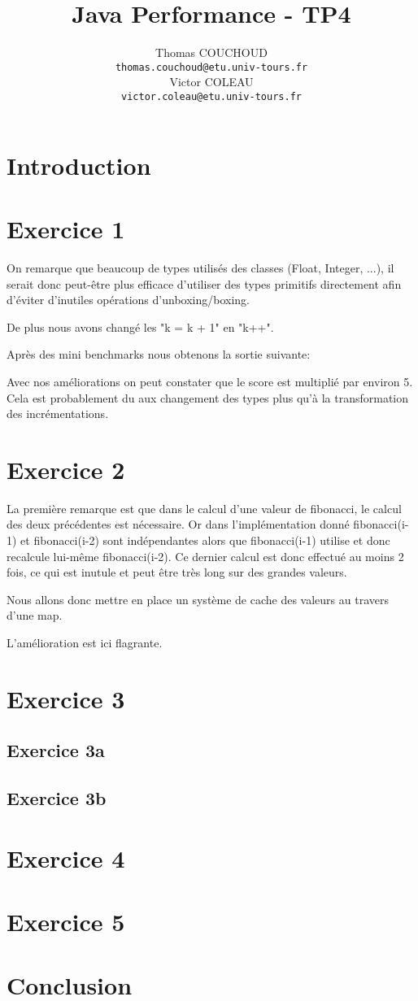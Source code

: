 \documentclass{report}
\title{Java Performance - TP4}
\author{Thomas COUCHOUD\\\texttt{thomas.couchoud@etu.univ-tours.fr}\\Victor COLEAU\\\texttt{victor.coleau@etu.univ-tours.fr}}
\begin{document}
	\mccTitle
	
	\chapter{Introduction}
	
	\chapter{Exercice 1}
		On remarque que beaucoup de types utilisés des classes (Float, Integer, ...), il serait donc peut-être plus efficace d'utiliser des types primitifs directement afin d'éviter d'inutiles opérations d'unboxing/boxing.
		
		De plus nous avons changé les "k = k + 1" en "k++".
		
		Après des mini benchmarks nous obtenons la sortie suivante:
		
		
		Avec nos améliorations on peut constater que le score est multiplié par environ 5.
		Cela est probablement du aux changement des types plus qu'à la transformation des incrémentations.

	\chapter{Exercice 2}
		La première remarque est que dans le calcul d'une valeur de fibonacci, le calcul des deux précédentes est nécessaire.
		Or dans l'implémentation donné fibonacci(i-1) et fibonacci(i-2) sont indépendantes alors que fibonacci(i-1) utilise et donc recalcule lui-même fibonacci(i-2).
		Ce dernier calcul est donc effectué au moins 2 fois, ce qui est inutule et peut être très long sur des grandes valeurs.
		
		Nous allons donc mettre en place un système de cache des valeurs au travers d'une map.
		
		
		
		L'amélioration est ici flagrante.
		
	
	\chapter{Exercice 3}
		\section{Exercice 3a}
		
		\section{Exercice 3b}

	\chapter{Exercice 4}
	
	\chapter{Exercice 5}
	
	\chapter{Conclusion}
\end{document}
